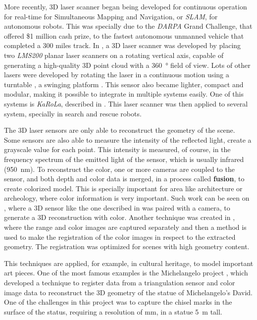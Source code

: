 More recently, 3D laser scanner began being developed for continuous operation for real-time for Simultaneous Mapping and Navigation, or \textit{SLAM}, for autonomous robots. This was specially due to the \textit{DARPA} Grand Challenge, that offered \$1 million cash prize, to the fastest autonomous unmanned vehicle that completed a 300 miles track. In \cite{maurelli2009}, a 3D laser scanner was developed by placing two \textit{LMS200} planar laser scanners on a rotating vertical axis, capable of generating a high-quality 3D point cloud with a \SI{360}{\degree} field of view. Lots of other lasers were developed by rotating the laser in a continuous motion using a turntable \cite{nemoto2007}, a swinging platform \cite{yoshida11}. This sensor also became lighter, compact and modular, making it possible to integrate in multiple systems easily. One of this systems is \textit{KaRoLa}, described in \cite{karola14}. This laser scanner was then applied to several system, specially in search and rescue robots.

The 3D laser sensors are only able to reconstruct the geometry of the scene. Some sensors are also able to measure the intensity of the reflected light, create a grayscale value for each point. This intensity is measured, of course, in the frequency spectrum of the emitted light of the sensor, which is usually infrared (\SI{950}{\nano\meter}). To reconstruct the color, one or more cameras are coupled to the sensor, and both depth and color data is merged, in a process called \textbf{fusion}, to create colorized model. This is specially important for area like architecture or archeology, where color information is very important. Such work can be seen on \cite{pdias2006}, where a 3D sensor like the one described in \cite{surmann2003} was paired with a camera, to generate a 3D reconstruction with color. Another technique was created in \cite{stamus2000}, where the range and color images are captured separately and then a method is used to make the registration of the color images in respect to the extracted geometry. The registration was optimized for scenes with high geometry content.

This techniques are applied, for example, in cultural heritage, to model important art pieces. One of the most famous examples is the Michelangelo project \cite{levoy2000}, which developed a technique to register data from a triangulation sensor and color image data to reconstruct the 3D geometry of the statue of Michelangelo's David. One of the challenges in this project was to capture the chisel marks in the surface of the status, requiring a resolution of  \si{\milli\meter}, in a statue \SI{5}{\meter} tall.

